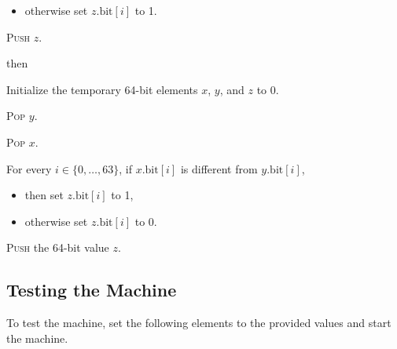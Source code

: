 \documentclass[a4paper,12pt]{article}
\newcommand{\num}[1]{\texttt{#1}}
\newcommand{\hex}[1]{\num{#1}_{\textup{\tiny 16}}}
\newcommand{\bitno}[2]{#1.\mathrm{bit}[#2]}
\newcommand{\range}[2]{\{#1,\ldots,#2\}}
\newcommand{\proc}[1]{\textsc{#1}}
\newcommand{\op}[1]{$#1$}
\newcommand{\XOR}       [1]{\op{\hex{2B}}}
\begin{document}
\begin{stepnumbers}[start=3]
\begin{description}
\begin{stepnumbers}
\begin{itemize}[label=]
      \item otherwise set $\bitno{z}{i}$ to 1.
      \end{itemize}
    \item \proc{Push} $z$.
    \end{stepnumbers}
  \item[\XOR{}] then
    \begin{stepnumbers}
    \item Initialize the temporary 64-bit elements $x$, $y$, and $z$ to 0.
    \item \proc{Pop} $y$.
    \item \proc{Pop} $x$.
    \item For every $i \in \range{0}{63}$, if $\bitno{x}{i}$ is different from $\bitno{y}{i}$,
      \begin{itemize}[label=]
      \item then set $\bitno{z}{i}$ to 1,
      \item otherwise set $\bitno{z}{i}$ to 0.
      \end{itemize}
    \item \proc{Push} the 64-bit value $z$.
    \end{stepnumbers}
  \end{description}
\end{stepnumbers}

\subsection{Testing the Machine}

To test the machine, set the following elements to the provided values and start the machine.
\end{document}
